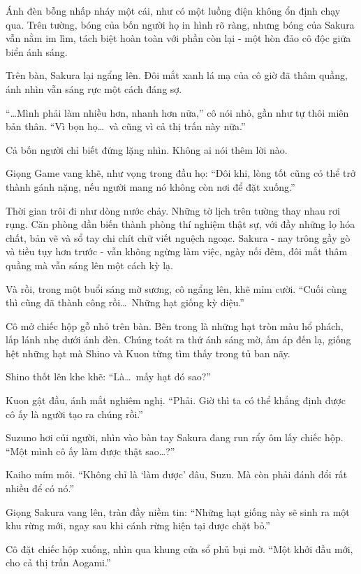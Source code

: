 \documentclass[../main.tex]{subfiles}
\begin{document}
Ánh đèn bỗng nhấp nháy một cái, như có một luồng điện không ổn định chạy qua. Trên tường, bóng của bốn người họ in hình rõ ràng, nhưng bóng của Sakura vẫn nằm im lìm, tách biệt hoàn toàn với phần còn lại - một hòn đảo cô độc giữa biển ánh sáng.

Trên bàn, Sakura lại ngẩng lên. Đôi mắt xanh lá mạ của cô giờ đã thâm quầng, ánh nhìn vẫn sáng rực một cách đáng sợ.

``\dots Mình phải làm nhiều hơn, nhanh hơn nữa,'' cô nói nhỏ, gần như tự thôi miên bản thân. ``Vì bọn họ\dots\ và cũng vì cả thị trấn này nữa.''

Cả bốn người chỉ biết đứng lặng nhìn. Không ai nói thêm lời nào.

Giọng Game vang khẽ, như vọng trong đầu họ: ``Đôi khi, lòng tốt cũng có thể trở thành gánh nặng, nếu người mang nó không còn nơi để đặt xuống.''

\ct

Thời gian trôi đi như dòng nước chảy. Những tờ lịch trên tường thay nhau rơi rụng. Căn phòng dần biến thành phòng thí nghiệm thật sự, với đầy những lọ hóa chất, bản vẽ và sổ tay chi chít chữ viết nguệch ngoạc.
Sakura -  nay trông gầy gò và tiều tụy hơn trước - vẫn không ngừng làm việc, ngày nối đêm, đôi mắt thâm quầng mà vẫn sáng lên một cách kỳ lạ.

Và rồi, trong một buổi sáng mờ sương, cô ngẩng lên, khẽ mỉm cười. ``Cuối cùng thì cũng đã thành công rồi\dots\ Những hạt giống kỳ diệu.''


Cô mở chiếc hộp gỗ nhỏ trên bàn. Bên trong là những hạt tròn màu hổ phách, lấp lánh nhẹ dưới ánh đèn. Chúng toát ra thứ ánh sáng mờ, ấm áp đến lạ, giống hệt những hạt mà Shino và Kuon từng tìm thấy trong tủ ban nãy.

Shino thốt lên khe khẽ: ``Là\dots\ mấy hạt đó sao?''

Kuon gật đầu, ánh mắt nghiêm nghị. ``Phải. Giờ thì ta có thể khẳng định được cô ấy là người tạo ra chúng rồi.''

Suzuno hơi cúi người, nhìn vào bàn tay Sakura đang run rẩy ôm lấy chiếc hộp. ``Một mình cô ấy làm được thật sao\dots?''

Kaiho mím môi. ``Không chỉ là `làm được' đâu, Suzu. Mà còn phải đánh đổi rất nhiều để có nó.''

Giọng Sakura vang lên, tràn đầy niềm tin: ``Những hạt giống này sẽ sinh ra một khu rừng mới, ngay sau khi cánh rừng hiện tại được chặt bỏ.''

Cô đặt chiếc hộp xuống, nhìn qua khung cửa sổ phủ bụi mờ. ``Một khởi đầu mới, cho cả thị trấn Aogami.''
\end{document}

